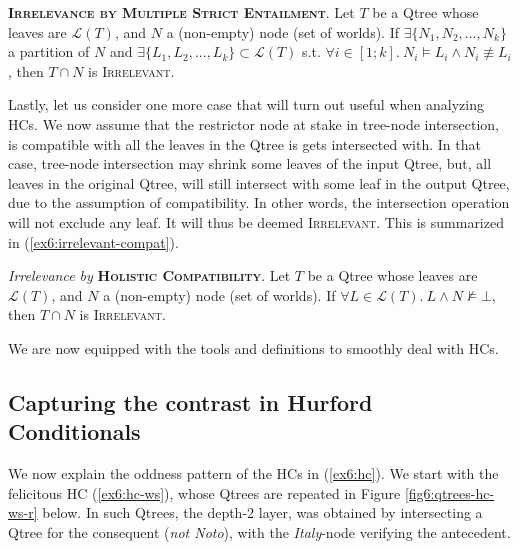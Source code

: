 \begin{exe}
	\ex\label{ex6:irrelevant-inter-complex} {\textsc{\textbf{Irrelevance by Multiple Strict Entailment}}. Let $T$ be a Qtree whose leaves are $\mathcal{L}(T)$, and $N$ a (non-empty) node (set of worlds). If $\exists \lbrace N_1, N_2, ..., N_k \rbrace$ a partition of $N$ and $\exists \lbrace L_1, L_2, ..., L_k \rbrace \subset \mathcal{L}(T)$ s.t. $\forall i \in [1; k]. \ N_i \vDash L_i \wedge N_i \not\equiv L_i$, then $T\cap N$ is \textsc{Irrelevant}.}
\end{exe}

Lastly, let us consider one more case that will turn out useful when analyzing HCs. We now assume that the restrictor node at stake in tree-node intersection, is compatible with all the leaves in the Qtree is gets intersected with. In that case, tree-node intersection may shrink some leaves of the input Qtree, but, all leaves in the original Qtree, will still intersect with some leaf in the output Qtree, due to the assumption of compatibility. In other words, the intersection operation will not exclude any leaf. It will thus be deemed \textsc{Irrelevant}. This is summarized in (\ref{ex6:irrelevant-compat}). 

\begin{exe}
	\ex\label{ex6:irrelevant-compat} {\textit{Irrelevance by} \textsc{\textbf{Holistic Compatibility}}. Let $T$ be a Qtree whose leaves are $\mathcal{L}(T)$, and $N$ a (non-empty) node (set of worlds). If $\forall L \in \mathcal{L}(T). \ L \wedge N \not\vDash \bot$, then $T\cap N$ is \textsc{Irrelevant}.}
\end{exe}

We are now equipped with the tools and definitions to smoothly deal with HCs. 

\subsection{Capturing the contrast in Hurford Conditionals}

We now explain the oddness pattern of the HCs in (\ref{ex6:hc}). We start with the felicitous HC (\ref{ex6:hc-ws}), whose Qtrees are repeated in Figure \ref{fig6:qtrees-hc-ws-r} below. In such Qtrees, the depth-$2$ layer, was obtained by intersecting a Qtree for the consequent (\textit{not Noto}), with the \textit{Italy}-node verifying the antecedent. 

